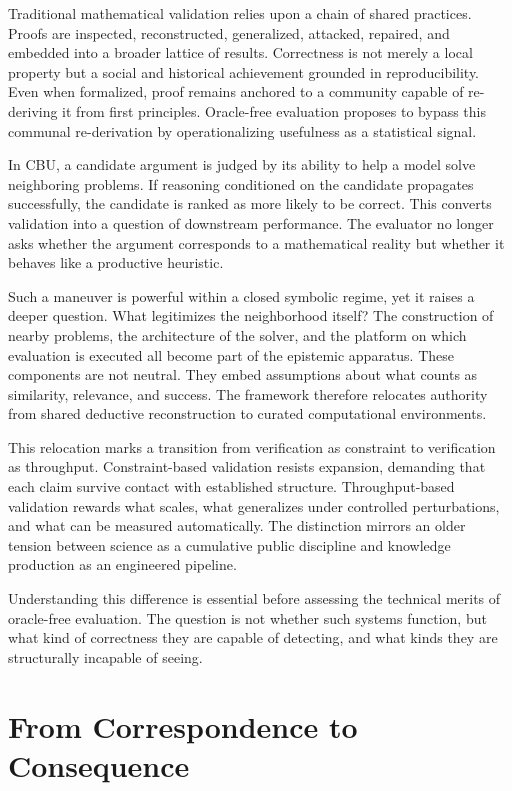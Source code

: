 \documentclass[12pt]{article}
\begin{document}
Traditional mathematical validation relies upon a chain of shared practices. Proofs are inspected, reconstructed, generalized, attacked, repaired, and embedded into a broader lattice of results. Correctness is not merely a local property but a social and historical achievement grounded in reproducibility. Even when formalized, proof remains anchored to a community capable of re-deriving it from first principles. Oracle-free evaluation proposes to bypass this communal re-derivation by operationalizing usefulness as a statistical signal.

In CBU, a candidate argument is judged by its ability to help a model solve neighboring problems. If reasoning conditioned on the candidate propagates successfully, the candidate is ranked as more likely to be correct. This converts validation into a question of downstream performance. The evaluator no longer asks whether the argument corresponds to a mathematical reality but whether it behaves like a productive heuristic.

Such a maneuver is powerful within a closed symbolic regime, yet it raises a deeper question. What legitimizes the neighborhood itself? The construction of nearby problems, the architecture of the solver, and the platform on which evaluation is executed all become part of the epistemic apparatus. These components are not neutral. They embed assumptions about what counts as similarity, relevance, and success. The framework therefore relocates authority from shared deductive reconstruction to curated computational environments.

This relocation marks a transition from verification as constraint to verification as throughput. Constraint-based validation resists expansion, demanding that each claim survive contact with established structure. Throughput-based validation rewards what scales, what generalizes under controlled perturbations, and what can be measured automatically. The distinction mirrors an older tension between science as a cumulative public discipline and knowledge production as an engineered pipeline.

Understanding this difference is essential before assessing the technical merits of oracle-free evaluation. The question is not whether such systems function, but what kind of correctness they are capable of detecting, and what kinds they are structurally incapable of seeing.

\section{From Correspondence to Consequence}
\end{document}
